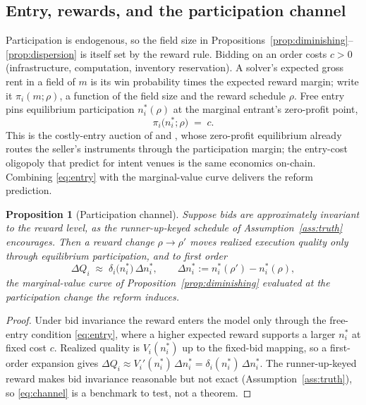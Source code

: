 \documentclass[11pt]{article}
\theoremstyle{plain}
\newtheorem{proposition}{Proposition}
\theoremstyle{definition}
\theoremstyle{remark}
\begin{document}
\subsection{Entry, rewards, and the participation channel}\label{sec:model-entry}
Participation is endogenous, so the field size in Propositions~\ref{prop:diminishing}--\ref{prop:dispersion} is itself set by the reward rule. Bidding on an order costs $c>0$ (infrastructure, computation, inventory reservation). A solver's expected gross rent in a field of $m$ is its win probability times the expected reward margin; write it $\pi_i(m;\rho)$, a function of the field size and the reward schedule $\rho$. Free entry pins equilibrium participation $n^\ast_i(\rho)$ at the marginal entrant's zero-profit point,
\begin{equation}\label{eq:entry}
\pi_i\big(n^\ast_i;\rho\big)\;=\;c .
\end{equation}
This is the costly-entry auction of \citet{mcafee1987entry} and \citet{levin1994entry}, whose zero-profit equilibrium already routes the seller's instruments through the participation margin; the entry-cost oligopoly that \citet{chitra2024intent} predict for intent venues is the same economics on-chain. Combining \eqref{eq:entry} with the marginal-value curve delivers the reform prediction.

\begin{proposition}[Participation channel]\label{prop:neutrality}
Suppose bids are approximately invariant to the reward level, as the runner-up-keyed schedule of Assumption~\ref{ass:truth} encourages. Then a reward change $\rho\to\rho'$ moves realized execution quality only through equilibrium participation, and to first order
\begin{equation}\label{eq:channel}
\Delta Q_i \;\approx\; \delta_i\!\big(n^\ast_i\big)\,\Delta n^\ast_i,
\qquad \Delta n^\ast_i := n^\ast_i(\rho')-n^\ast_i(\rho),
\end{equation}
the marginal-value curve of Proposition~\ref{prop:diminishing} evaluated at the participation change the reform induces.
\end{proposition}
\begin{proof}
Under bid invariance the reward enters the model only through the free-entry condition \eqref{eq:entry}, where a higher expected reward supports a larger $n^\ast_i$ at fixed cost $c$. Realized quality is $V_i(n^\ast_i)$ up to the fixed-bid mapping, so a first-order expansion gives $\Delta Q_i\approx V_i'(n^\ast_i)\,\Delta n^\ast_i=\delta_i(n^\ast_i)\,\Delta n^\ast_i$. The runner-up-keyed reward makes bid invariance reasonable but not exact (Assumption~\ref{ass:truth}), so \eqref{eq:channel} is a benchmark to test, not a theorem.
\end{proof}
\end{document}

